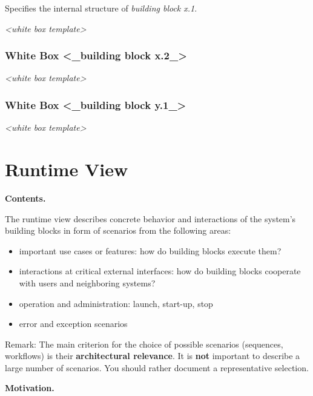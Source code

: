 \documentclass[]{article}
\begin{document}
Specifies the internal structure of \emph{building block x.1}.

\emph{\textless{}white box template\textgreater{}}

\hypertarget{_white_box_building_block_x_2}{%
\subsubsection{White Box \textless{}\_building block
x.2\_\textgreater{}}\label{_white_box_building_block_x_2}}

\emph{\textless{}white box template\textgreater{}}

\hypertarget{_white_box_building_block_y_1}{%
\subsubsection{White Box \textless{}\_building block
y.1\_\textgreater{}}\label{_white_box_building_block_y_1}}

\emph{\textless{}white box template\textgreater{}}

\hypertarget{section-runtime-view}{%
\section{Runtime View}\label{section-runtime-view}}

\textbf{Contents.}

The runtime view describes concrete behavior and interactions of the
system's building blocks in form of scenarios from the following areas:

\begin{itemize}
\item
  important use cases or features: how do building blocks execute them?
\item
  interactions at critical external interfaces: how do building blocks
  cooperate with users and neighboring systems?
\item
  operation and administration: launch, start-up, stop
\item
  error and exception scenarios
\end{itemize}

Remark: The main criterion for the choice of possible scenarios
(sequences, workflows) is their \textbf{architectural relevance}. It is
\textbf{not} important to describe a large number of scenarios. You
should rather document a representative selection.

\textbf{Motivation.}
\end{document}
